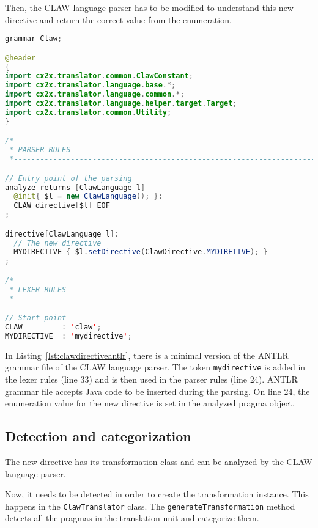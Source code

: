 Then, the CLAW language parser has to be modified to understand this new
directive and return the correct value from the enumeration.

\begin{lstlisting}[label=lst:clawdirectiveantlr, caption=Claw.g4, language=java]
grammar Claw;

@header
{
import cx2x.translator.common.ClawConstant;
import cx2x.translator.language.base.*;
import cx2x.translator.language.common.*;
import cx2x.translator.language.helper.target.Target;
import cx2x.translator.common.Utility;
}

/*----------------------------------------------------------------------------
 * PARSER RULES
 *----------------------------------------------------------------------------*/

// Entry point of the parsing
analyze returns [ClawLanguage l]
  @init{ $l = new ClawLanguage(); }:
  CLAW directive[$l] EOF
;

directive[ClawLanguage l]:
  // The new directive
  MYDIRECTIVE { $l.setDirective(ClawDirective.MYDIRETIVE); }
;

/*----------------------------------------------------------------------------
 * LEXER RULES
 *----------------------------------------------------------------------------*/

// Start point
CLAW         : 'claw';
MYDIRECTIVE  : 'mydirective';
\end{lstlisting}

In Listing~\ref{lst:clawdirectiveantlr}, there is a minimal version of the
ANTLR grammar file of the CLAW language parser. The token
\lstinline|mydirective| is added in the lexer rules (line 33) and is then
used in the parser rules (line 24). ANTLR grammar file accepts Java code
to be inserted during the parsing. On line 24, the enumeration value for
the new directive is set in the analyzed pragma object.

\subsection{Detection and categorization}
The new directive has its transformation class and can be analyzed by the
CLAW language parser.

Now, it needs to be detected in order to create the transformation instance.
This happens in the \lstinline|ClawTranslator| class. The
\lstinline|generateTransformation| method detects all the pragmas in the 
translation unit and categorize them.


